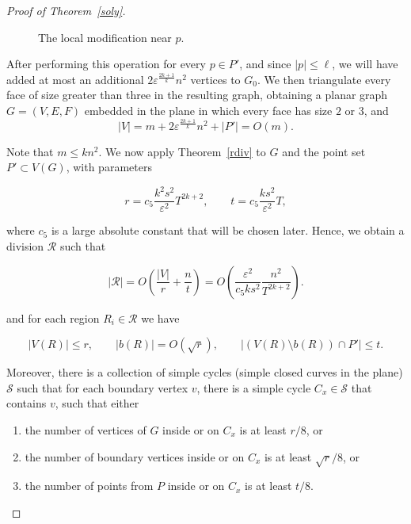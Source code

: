 \documentclass[10pt,a4paper]{amsart}
\begin{document}
\begin{proof}[Proof of Theorem~\ref{soly}]
 

\begin{figure}
    \centering
    
    \caption{The local modification near $p$.}
    \label{X}
\end{figure}

After performing this operation for every $p \in P'$, and since $|p|\leq \ell$,  we will have added at most an additional $2\varepsilon^{\frac{2k+1}{k}}n^2$ vertices to $G_0$. We then triangulate every face of size greater than three in the resulting graph, obtaining a planar graph \(G=(V,E,F)\) embedded in the plane in which every face has size \(2\) or \(3\), and
\[
|V| = m + 2\varepsilon^{\frac{2k+1}{k}}n^2 + |P'| = O(m).
\]

\noindent  Note that $ m \leq kn^2$.  We now apply Theorem~\ref{rdiv} to $G$ and the  point set $P'\subset V(G)$, with parameters











\[
r = c_5\frac{k^2s^2}{\varepsilon^2}T^{2k+2}, 
\qquad
t =  c_5\frac{ks^2}{\varepsilon^2}T,
\]

\noindent where $c_5$ is a large absolute constant that will be chosen later.  Hence, we obtain a division $\mathcal R$ such that

$$|\mathcal R| = O\left( \frac{|V|}{r } + \frac{n}{t}\right) =  
O\!\left(
\frac{\varepsilon^2}{c_5ks^2}
\frac{n^2}{T^{2k+2}}
\right).$$


\noindent and for each region $R_i \in \mathcal R$ we have


\[
|V(R)|\le r,\qquad |b(R)|=O(\sqrt r), \qquad 
  |(V(R)\setminus b(R))\cap P'| \le t.
\]

\noindent  Moreover, there is a collection of simple cycles (simple closed curves in the plane) $\mathcal S$ such that for each boundary vertex $v$, there is a simple cycle $C_x \in \mathcal{S}$ that contains $v$, such that either


\begin{enumerate}
     
    \item the number of vertices of $G$ inside or on $C_x$ is at least $r/8$, or

    \item the number of boundary vertices inside or on $C_x$ is at least $\sqrt{r}/8$, or

    \item the number of points from $P$ inside or on $C_x$ is at least $t/8.$
 \end{enumerate}


\end{proof}
\end{document}
